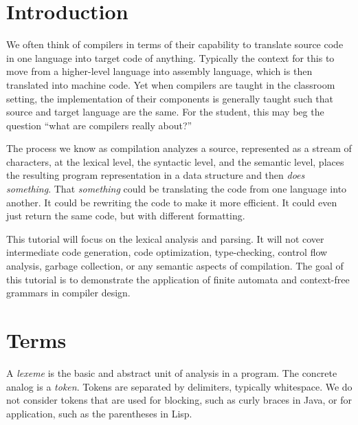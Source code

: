 \documentclass{article}[12pt]
\begin{document}
\section{Introduction}
We often think of compilers in terms of their capability to translate source code in one language into target code of anything. Typically the context for this to move from a higher-level language into assembly language, which is then translated into machine code. Yet when compilers are taught in the classroom setting, the implementation of their components is generally taught such that source and target language are the same. For the student, this may beg the question ``what are compilers really about?''

The process we know as compilation analyzes a source, represented as a stream of characters, at the lexical level, the syntactic level, and the semantic level, places the resulting program representation in a data structure and then \emph{does something}. That \emph{something} could be translating the code from one language into another. It could be rewriting the code to make it more efficient. It could even just return the same code, but with different formatting. 

This tutorial will focus on the lexical analysis and parsing. It will not cover intermediate code generation, code optimization, type-checking, control flow analysis, garbage collection, or any semantic aspects of compilation. The goal of this tutorial is to demonstrate the application of finite automata and context-free grammars in compiler design.

\section{Terms}
A \emph{lexeme} is the basic and abstract unit of analysis in a program. The concrete analog is a \emph{token}. Tokens are separated by delimiters, typically whitespace. We do not consider tokens that are used for blocking, such as curly braces in Java, or for application\footnotemark{}, such as the parentheses in Lisp.
\end{document}

